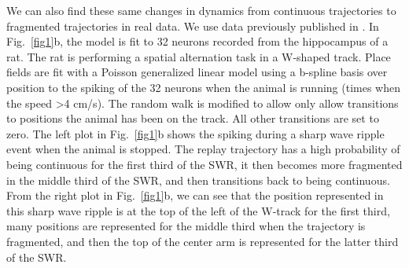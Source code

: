 \documentclass[conference]{IEEEtran}
\begin{document}
We can also find these same changes in dynamics from continuous trajectories to fragmented trajectories in real data. We use data previously published in \cite{KarlssonAwakereplayremote2009}. In Fig.~\ref{fig1}b, the model is fit to 32 neurons recorded from the hippocampus of a rat. The rat is performing a spatial alternation task in a W-shaped track. Place fields are fit with a Poisson generalized linear model using a b-spline basis over position to the spiking of the 32 neurons when the animal is running (times when the speed >4 cm/s). The random walk is modified to allow only allow transitions  to positions the animal has been on the track. All other transitions are set to zero. The left plot in Fig.~\ref{fig1}b shows the spiking during a sharp wave ripple event when the animal is stopped. The replay trajectory has a high probability of being continuous for the first third of the SWR, it then becomes more fragmented in the middle third of the SWR, and then transitions back to being continuous. From the right plot in Fig.~\ref{fig1}b, we can see that the position represented in this sharp wave ripple is at the top of the left of the W-track for the first third, many positions are represented for the middle third when the trajectory is fragmented, and then the top of the center arm is represented for the latter third of the SWR.
\end{document}
